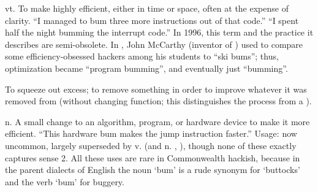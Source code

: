 
\begin{inparaenum}
\item vt. To make highly efficient, either in time or space, often at the expense
    of clarity. ``I managed to bum three more instructions out of that code.''
    ``I spent half the night bumming the interrupt code.'' In 1996, this term
    and the practice it describes are semi-obsolete. In ,
    John McCarthy (inventor of ) used to compare some
    efficiency-obsessed hackers among his students to ``ski bums''; thus,
    optimization became ``program bumming'', and eventually just ``bumming''.
\item To squeeze out excess; to remove something in order to improve whatever it
    was removed from (without changing function; this distinguishes the process
    from a ).
\item n. A small change to an algorithm, program, or hardware device to make it
    more efficient. ``This hardware bum makes the jump instruction faster.''
    Usage: now uncommon, largely superseded by v.  (and n.
    , ), though none of these exactly
    captures sense 2. All these uses are rare in
    Commonwealth hackish, because in the parent dialects of English the noun
    `bum' is a rude synonym for `buttocks' and the verb `bum' for buggery.
\end{inparaenum}

